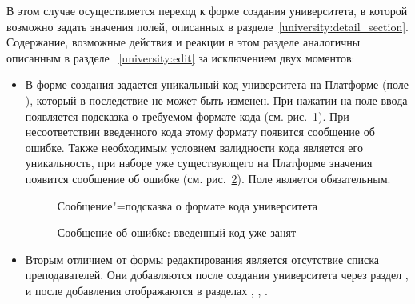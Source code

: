 В этом случае осуществляется переход к форме создания университета, в которой возможно задать значения полей, описанных в разделе~\ref{university:detail_section}. Содержание, возможные действия и реакции в этом разделе аналогичны описанным в разделе ~\ref{university:edit} за исключением двух моментов:
\begin{itemize}
	\item В форме создания задается уникальный код университета на Платформе (поле ), который в последствие не может быть изменен. При нажатии на поле ввода появляется подсказка о требуемом формате кода (см. рис.~\ref{university:create_slug_help}). При несоответствии введенного кода этому формату появится сообщение об ошибке. Также необходимым условием валидности кода является его уникальность, при наборе уже существующего на Платформе значения появится сообщение об ошибке (см. рис.~\ref{university:create_slug_exist}). Поле  является обязательным.
	
		\begin{figure}[H]
		\caption{Сообщение"=подсказка о формате кода университета}
		\label{university:create_slug_help}
		\end{figure}
		
		\begin{figure}[H]
		\caption{Сообщение об ошибке: введенный код уже занят}
		\label{university:create_slug_exist}
		\end{figure}	
		
	\item Вторым отличием от формы редактирования является отсутствие списка преподавателей. Они добавляются после создания университета через раздел , и после добавления отображаются в разделах , , .
\end{itemize}
	
	

		

	
	
	
	
	
	
